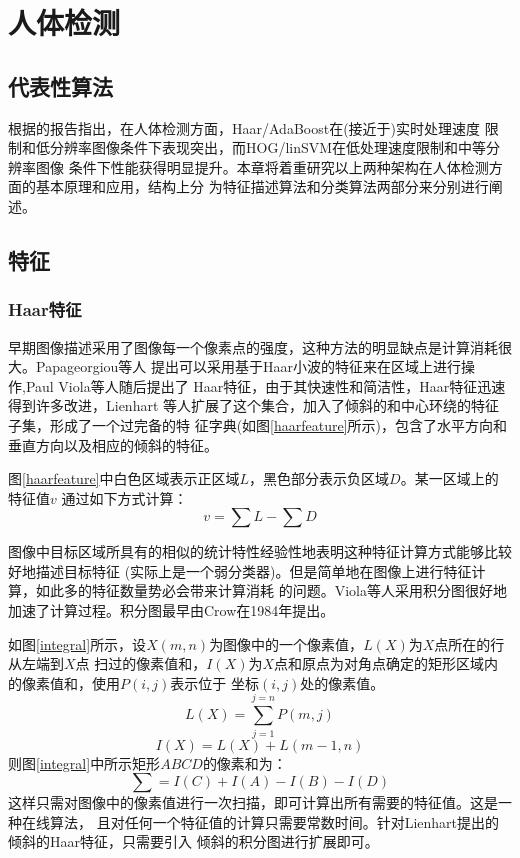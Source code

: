 \chapter{人体检测}
\section{代表性算法}
根据\cite{survey}的报告指出，在人体检测方面，Haar/AdaBoost\cite{haar}在(接近于)实时处理速度
限制和低分辨率图像条件下表现突出，而HOG/linSVM\cite{DT2005}在低处理速度限制和中等分辨率图像
条件下性能获得明显提升。本章将着重研究以上两种架构在人体检测方面的基本原理和应用，结构上分
为特征描述算法和分类算法两部分来分别进行阐述。
\section{特征}
\subsection{Haar特征}
早期图像描述采用了图像每一个像素点的强度，这种方法的明显缺点是计算消耗很大。Papageorgiou等人
提出可以采用基于Haar小波的特征来在区域上进行操作\cite{haarorigin1},Paul Viola等人随后提出了
Haar特征\cite{haarorigin}，由于其快速性和简洁性，Haar特征迅速得到许多改进，Lienhart
等人扩展了这个集合\cite{haarextend}，加入了倾斜的和中心环绕的特征子集，形成了一个过完备的特
征字典(如图\ref{haarfeature}所示)，包含了水平方向和垂直方向以及相应的倾斜的特征。


图\ref{haarfeature}中白色区域表示正区域$L$，黑色部分表示负区域$D$。某一区域上的特征值$v$
通过如下方式计算：
\begin{equation}
    v=\sum{}L-\sum{}D
\end{equation}

图像中目标区域所具有的相似的统计特性经验性地表明这种特征计算方式能够比较好地描述目标特征
(实际上是一个弱分类器)。但是简单地在图像上进行特征计算，如此多的特征数量势必会带来计算消耗
的问题。Viola等人采用积分图很好地加速了计算过程。积分图最早由Crow在1984年提出\cite{summedarea}。


如图\ref{integral}所示，设$X(m,n)$为图像中的一个像素值，$L(X)$为$X$点所在的行从左端到$X$点
扫过的像素值和，$I(X)$为$X$点和原点为对角点确定的矩形区域内的像素值和，使用$P(i,j)$表示位于
坐标$(i,j)$处的像素值。
\begin{equation}
    L(X)=\sum^{j=n}_{j=1}P(m,j)
\end{equation}
\begin{equation}
    I(X)=L(X)+L(m-1,n)
\end{equation}
则图\ref{integral}中所示矩形$ABCD$的像素和为：
\begin{equation}
    \sum=I(C)+I(A)-I(B)-I(D)
\end{equation}
这样只需对图像中的像素值进行一次扫描，即可计算出所有需要的特征值。这是一种在线算法，
且对任何一个特征值的计算只需要常数时间。针对Lienhart提出的倾斜的Haar特征，只需要引入
倾斜的积分图进行扩展即可。

